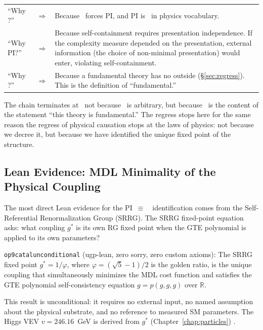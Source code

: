 \documentclass[11pt,openany]{book}
\theoremstyle{remark}
\newcommand{\MDL}{\text{MDL}}
\newcommand{\PSC}{\text{PSC}}
\newcommand{\lean}[1]{%
  \penalty-100
  \begingroup\def\_{\textunderscore\allowbreak}\texttt{#1}\endgroup}
\newcommand{\CatAL}{\ensuremath{\textbf{A}_{\rm Lean}}}
\begin{document}
\medskip
\begin{center}
\renewcommand{\arraystretch}{1.3}
\begin{tabular}{@{}p{4.5cm}p{0.3cm}p{8.5cm}@{}}
``Why \MDL?'' & $\Rightarrow$ & Because \PSC\ forces PI, and PI is \MDL\ in physics vocabulary. \\
``Why PI?'' & $\Rightarrow$ & Because self-containment requires presentation independence.
  If the complexity measure depended on the presentation, external
  information (the choice of non-minimal presentation) would enter,
  violating self-containment. \\
``Why \PSC?'' & $\Rightarrow$ & Because a fundamental theory has no outside
  (\S\ref{sec:regress}). This is the definition of ``fundamental.'' \\
\end{tabular}
\end{center}
\medskip

The chain terminates at \PSC\ not because \PSC\ is arbitrary, but because \PSC\ is the
content of the statement ``this theory is fundamental.'' The regress stops here for the
same reason the regress of physical causation stops at the laws of physics: not because
we decree it, but because we have identified the unique fixed point of the structure.

\subsection*{Lean Evidence: MDL Minimality of the Physical Coupling}

The most direct Lean evidence for the PI~$\equiv$~\MDL\ identification comes from the
Self-Referential Renormalization Group (SRRG). The SRRG fixed-point equation asks:
what coupling $g^*$ is its own RG fixed point when the GTE polynomial is applied to
its own parameters?

\begin{tcolorbox}[colback=orange!5,colframe=orange!60,
  title={Result: MDL-Minimizing Physical Coupling (\CatAL)}]
\lean{op9\_catal\_unconditional} (ugp-lean, zero sorry, zero custom axioms):
The SRRG fixed point $g^* = 1/\varphi$, where $\varphi = (\sqrt{5}-1)/2$ is the
golden ratio, is the unique coupling that simultaneously minimizes the MDL cost
function and satisfies the GTE polynomial self-consistency equation $g = p(g,g,g)$
over $\mathbb{R}$.

This result is unconditional: it requires no external input, no named assumption
about the physical substrate, and no reference to measured SM parameters.
The Higgs VEV $v = 246.16$~GeV is derived from $g^*$ (Chapter~\ref{chap:particles})
\cite{SpivackSRRG}.
\end{tcolorbox}
\end{document}

